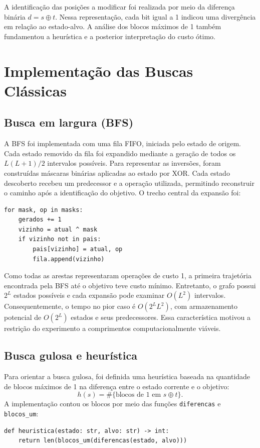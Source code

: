 \documentclass[conference,a4paper]{IEEEtran}
\begin{document}
A identificação das posições a modificar foi realizada por meio da diferença binária $d=s\oplus t$. Nessa representação, cada bit igual a 1 indicou uma divergência em relação ao estado-alvo. A análise dos blocos máximos de 1 também fundamentou a heurística e a posterior interpretação do custo ótimo.

\section{Implementação das Buscas Clássicas}
\subsection{Busca em largura (BFS)}
A BFS foi implementada com uma fila FIFO, iniciada pelo estado de origem. Cada estado removido da fila foi expandido mediante a geração de todos os $L(L+1)/2$ intervalos possíveis. Para representar as inversões, foram construídas máscaras binárias aplicadas ao estado por XOR. Cada estado descoberto recebeu um predecessor e a operação utilizada, permitindo reconstruir o caminho após a identificação do objetivo. O trecho central da expansão foi:
\begin{lstlisting}
for mask, op in masks:
    gerados += 1
    vizinho = atual ^ mask
    if vizinho not in pais:
        pais[vizinho] = atual, op
        fila.append(vizinho)
\end{lstlisting}

Como todas as arestas representaram operações de custo 1, a primeira trajetória encontrada pela BFS até o objetivo teve custo mínimo. Entretanto, o grafo possui $2^L$ estados possíveis e cada expansão pode examinar $O(L^2)$ intervalos. Consequentemente, o tempo no pior caso é $O(2^L L^2)$, com armazenamento potencial de $O(2^L)$ estados e seus predecessores. Essa característica motivou a restrição do experimento a comprimentos computacionalmente viáveis.

\subsection{Busca gulosa e heurística}
Para orientar a busca gulosa, foi definida uma heurística baseada na quantidade de blocos máximos de 1 na diferença entre o estado corrente e o objetivo:
\begin{equation}
\boxed{h(s)=\#\{\text{blocos de 1 em }s\oplus t\}.}
\end{equation}
A implementação contou os blocos por meio das funções \texttt{diferencas} e \texttt{blocos\_um}:
\begin{lstlisting}
def heuristica(estado: str, alvo: str) -> int:
    return len(blocos_um(diferencas(estado, alvo)))
\end{lstlisting}
\end{document}
